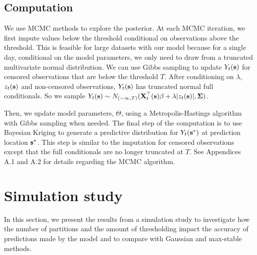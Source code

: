 \documentclass[useAMS,usenatbib,referee]{biom}
\begin{document}
\subsection{Computation}\label{sts:comp}
We use MCMC methods to explore the posterior.
At each MCMC iteration, we first impute values below the threshold conditional on observations above the threshold.
This is feasible for large datasets with our model because for a single day, conditional on the model parameters, we only need to draw from a truncated multivariate normal distribution.
We can use Gibbs sampling to update $Y_t(\mbox{\bf s})$ for censored observations that are below the threshold $T$.
After conditioning on $\lambda$, $z_t(\mbox{\bf s})$ and non-censored observations, $Y_t(\mbox{\bf s})$ has truncated normal full conditionals.
So we sample $Y_t(\mbox{\bf s}) \sim N_{(-\infty, T)}(\mbox{\bf X}_t^\top(\mbox{\bf s}) \beta + \lambda | z_t(\mbox{\bf s})|, \mbox{\boldmath $\Sigma$})$.

Then, we update model parameters, $\Theta$, using a Metropolis-Hastings algorithm with Gibbs sampling when needed.
The final step of the computation is to use Bayesian Kriging to generate a predictive distribution for $Y_t(\mbox{\bf s}^*)$ at prediction location $\mbox{\bf s}^*$.
This step is similar to the imputation for censored observations except that the full conditionals are no longer truncated at $T$.
See Appendices A.1 and A.2 for details regarding the MCMC algorithm.

\section{Simulation study}\label{sts:simstudy}
In this section, we present the results from a simulation study to investigate how the number of partitions and the amount of thresholding impact the accuracy of predictions made by the model and to compare with Gaussian and max-stable methods.
\end{document}
